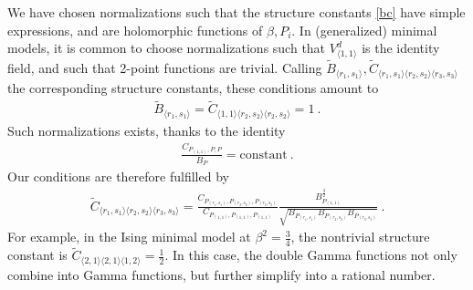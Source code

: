 \documentclass[12pt, a4paper]{article}
\theoremstyle{break}
\begin{document}
We have chosen normalizations such that the structure constants \eqref{bc} have simple expressions, and are holomorphic functions of $\beta,P_i$. In (generalized) minimal models, it is common to choose normalizations such that $V^d_{\langle 1,1\rangle}$ is the identity field, and such that 2-point functions are trivial. Calling $\widetilde{B}_{\langle r_1,s_1\rangle},\widetilde{C}_{\langle r_1,s_1\rangle\langle r_2,s_2\rangle \langle r_3,s_3\rangle}$ the corresponding structure constants, these conditions amount to 
\begin{align}
 \widetilde{B}_{\langle r_1,s_1\rangle} = \widetilde{C}_{\langle 1,1\rangle\langle r_2,s_2\rangle \langle r_2,s_2\rangle} = 1\ .
\end{align}
Such normalizations exists, thanks to the identity 
\begin{align}
 \frac{C_{P_{(1,1)}, P, P}}{B_P} = \text{constant}\ . 
\end{align}
Our conditions are therefore fulfilled by 
\begin{align}
 \widetilde{C}_{\langle r_1,s_1\rangle\langle r_2,s_2\rangle \langle r_3,s_3\rangle} 
 = \frac{C_{P_{(r_1,s_1)},P_{(r_2,s_2)},P_{(r_3,s_3)}}}{C_{P_{(1,1)},P_{(1,1)},P_{(1,1)}}}
 \frac{B_{P_{(1,1)}}^\frac32}
 {\sqrt{B_{P_{(r_1,s_1)}}B_{P_{(r_2,s_2)}} B_{P_{(r_3,s_3)}}}}\ .
 \label{wtc}
\end{align}
For example, in the Ising minimal model at $\beta^2=\frac34$, the nontrivial structure constant is $\widetilde{C}_{\langle 2,1\rangle\langle 2,1\rangle\langle 1,2\rangle}=\frac12$. In this case, the double Gamma functions not only combine into Gamma functions, but further simplify into a rational number. 
\end{document}
